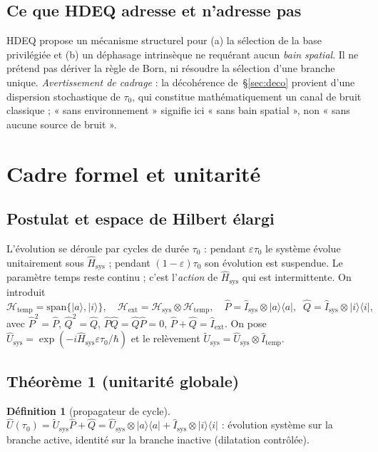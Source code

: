 \documentclass[11pt,a4paper]{article}
\newcommand{\ket}[1]{\lvert #1\rangle}
\newcommand{\bra}[1]{\langle #1\rvert}
\newcommand{\Hext}{\mathcal{H}_{\mathrm{ext}}}
\newcommand{\Hsys}{\mathcal{H}_{\mathrm{sys}}}
\newcommand{\Htemp}{\mathcal{H}_{\mathrm{temp}}}
\newcommand{\Usys}{\hat{U}_{\mathrm{sys}}}
\newcommand{\Hsysop}{\hat{H}_{\mathrm{sys}}}
\newcommand{\Iext}{\hat{I}_{\mathrm{ext}}}
\newcommand{\Isys}{\hat{I}_{\mathrm{sys}}}
\theoremstyle{plain}
\theoremstyle{definition}
\newtheorem{definition}{D\'efinition}
\theoremstyle{remark}
\begin{document}
\subsection{Ce que HDEQ adresse et n'adresse pas}
HDEQ propose un m\'ecanisme structurel pour (a) la s\'election de la base privil\'egi\'ee
et (b) un d\'ephasage intrins\`eque ne requ\'erant aucun \emph{bain spatial}. Il ne
pr\'etend pas d\'eriver la r\`egle de Born, ni r\'esoudre la s\'election d'une branche
unique. \emph{Avertissement de cadrage} : la d\'ecoh\'erence de~\S\ref{sec:deco}
provient d'une dispersion stochastique de $\tau_0$, qui constitue math\'ematiquement
un canal de bruit classique ; « sans environnement » signifie ici « sans bain
spatial », non « sans aucune source de bruit ».

\section{Cadre formel et unitarit\'e}\label{sec:cadre}
\subsection{Postulat et espace de Hilbert \'elargi}
L'\'evolution se d\'eroule par cycles de dur\'ee $\tau_0$ : pendant $\varepsilon\tau_0$ le
syst\`eme \'evolue unitairement sous $\Hsysop$ ; pendant $(1-\varepsilon)\tau_0$ son
\'evolution est suspendue. Le param\`etre temps reste continu ; c'est l'\emph{action}
de $\Hsysop$ qui est intermittente. On introduit
\[
\Htemp=\mathrm{span}\{\ket{a},\ket{i}\},\quad
\Hext=\Hsys\otimes\Htemp,\quad
\hat{P}=\Isys\otimes\ket{a}\bra{a},\;\;
\hat{Q}=\Isys\otimes\ket{i}\bra{i},
\]
avec $\hat{P}^2=\hat{P}$, $\hat{Q}^2=\hat{Q}$, $\hat{P}\hat{Q}=\hat{Q}\hat{P}=0$,
$\hat{P}+\hat{Q}=\Iext$. On pose $\Usys=\exp(-i\Hsysop\varepsilon\tau_0/\hbar)$ et
le rel\`evement $\tilde{U}_{\mathrm{sys}}=\Usys\otimes\hat{I}_{\mathrm{temp}}$.

\subsection{Th\'eor\`eme 1 (unitarit\'e globale)}

\begin{definition}[propagateur de cycle]
$\hat{U}(\tau_0)=\tilde{U}_{\mathrm{sys}}\hat{P}+\hat{Q}
=\Usys\otimes\ket{a}\bra{a}+\Isys\otimes\ket{i}\bra{i}$ : \'evolution syst\`eme sur la
branche active, identit\'e sur la branche inactive (dilatation contr\^ol\'ee).
\end{definition}
\end{document}
